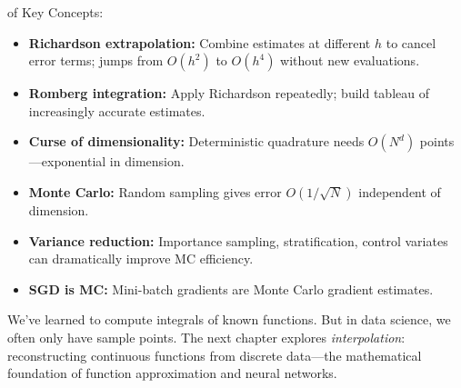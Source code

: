  of Key Concepts:
\begin{itemize}
    \item \textbf{Richardson extrapolation:} Combine estimates at different $h$ to cancel error terms; jumps from $O(h^2)$ to $O(h^4)$ without new evaluations.
    \item \textbf{Romberg integration:} Apply Richardson repeatedly; build tableau of increasingly accurate estimates.
    \item \textbf{Curse of dimensionality:} Deterministic quadrature needs $O(N^d)$ points---exponential in dimension.
    \item \textbf{Monte Carlo:} Random sampling gives error $O(1/\sqrt{N})$ independent of dimension.
    \item \textbf{Variance reduction:} Importance sampling, stratification, control variates can dramatically improve MC efficiency.
    \item \textbf{SGD is MC:} Mini-batch gradients are Monte Carlo gradient estimates.
\end{itemize}



 We've learned to compute integrals of known functions. But in data science, we often only have sample points. The next chapter explores \emph{interpolation}: reconstructing continuous functions from discrete data---the mathematical foundation of function approximation and neural networks.



